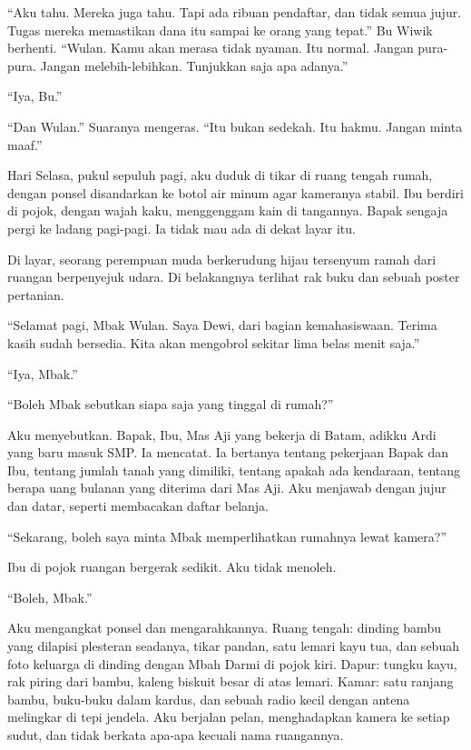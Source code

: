 \documentclass[11pt,twoside,openany]{book}
\makeatletter
\newcommand{\scenebreak}{\par\vspace{0.9em}{\centering\textsc{*\hspace{0.7em}*\hspace{0.7em}*}\par}\vspace{0.9em}\@afterindentfalse\@afterheading}
\makeatother
\begin{document}
``Aku tahu. Mereka juga tahu. Tapi ada ribuan pendaftar, dan tidak semua jujur. Tugas mereka memastikan dana itu sampai ke orang yang tepat.'' Bu Wiwik berhenti. ``Wulan. Kamu akan merasa tidak nyaman. Itu normal. Jangan pura-pura. Jangan melebih-lebihkan. Tunjukkan saja apa adanya.''

``Iya, Bu.''

``Dan Wulan.'' Suaranya mengeras. ``Itu bukan sedekah. Itu hakmu. Jangan minta maaf.''

\scenebreak
Hari Selasa, pukul sepuluh pagi, aku duduk di tikar di ruang tengah rumah, dengan ponsel disandarkan ke botol air minum agar kameranya stabil. Ibu berdiri di pojok, dengan wajah kaku, menggenggam kain di tangannya. Bapak sengaja pergi ke ladang pagi-pagi. Ia tidak mau ada di dekat layar itu.

Di layar, seorang perempuan muda berkerudung hijau tersenyum ramah dari ruangan berpenyejuk udara. Di belakangnya terlihat rak buku dan sebuah poster pertanian.

``Selamat pagi, Mbak Wulan. Saya Dewi, dari bagian kemahasiswaan. Terima kasih sudah bersedia. Kita akan mengobrol sekitar lima belas menit saja.''

``Iya, Mbak.''

``Boleh Mbak sebutkan siapa saja yang tinggal di rumah?''

Aku menyebutkan. Bapak, Ibu, Mas Aji yang bekerja di Batam, adikku Ardi yang baru masuk SMP. Ia mencatat. Ia bertanya tentang pekerjaan Bapak dan Ibu, tentang jumlah tanah yang dimiliki, tentang apakah ada kendaraan, tentang berapa uang bulanan yang diterima dari Mas Aji. Aku menjawab dengan jujur dan datar, seperti membacakan daftar belanja.

``Sekarang, boleh saya minta Mbak memperlihatkan rumahnya lewat kamera?''

Ibu di pojok ruangan bergerak sedikit. Aku tidak menoleh.

``Boleh, Mbak.''

Aku mengangkat ponsel dan mengarahkannya. Ruang tengah: dinding bambu yang dilapisi plesteran seadanya, tikar pandan, satu lemari kayu tua, dan sebuah foto keluarga di dinding dengan Mbah Darmi di pojok kiri. Dapur: tungku kayu, rak piring dari bambu, kaleng biskuit besar di atas lemari. Kamar: satu ranjang bambu, buku-buku dalam kardus, dan sebuah radio kecil dengan antena melingkar di tepi jendela. Aku berjalan pelan, menghadapkan kamera ke setiap sudut, dan tidak berkata apa-apa kecuali nama ruangannya.
\end{document}
